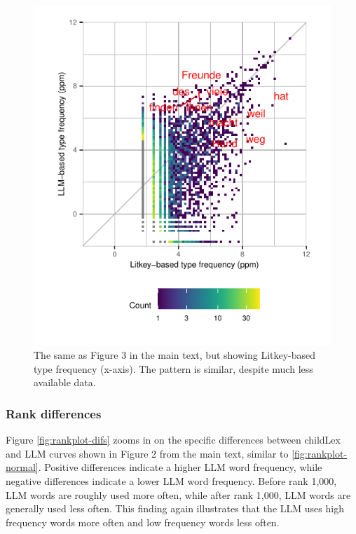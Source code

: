 \documentclass[doc, a4paper]{apa7}
\begin{document}
\begin{figure}[!htbp]
  \centerline{
    \includegraphics[scale=1.4]{figures/litkey.pdf}}
    \caption{The same as Figure 3 in the main text, but showing Litkey-based type frequency (x-axis). The pattern is similar, despite much less available data. }
    \label{fig:corlitkey}
\end{figure}

\clearpage


\subsubsection{Rank differences}

Figure \ref{fig:rankplot-difs} zooms in on the specific differences between childLex and LLM curves shown in Figure 2 from the main text, similar to \ref{fig:rankplot-normal}. Positive differences indicate a higher LLM word frequency, while negative differences indicate a lower LLM word frequency. Before rank 1,000, LLM words are roughly used more often, while after rank 1,000, LLM words are generally used less often. This finding again illustrates that the LLM uses high frequency words more often and low frequency words less often.  
\end{document}
